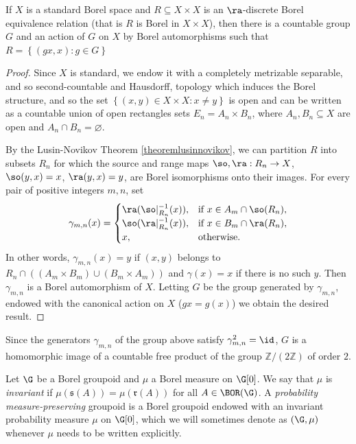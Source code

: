 \begin{corollary}\label{corollaryfeldmanmoore}
If $X$ is a standard Borel space and $R\subseteq X\times X$ is an $\ra$-discrete Borel equivalence relation (that is $R$ is Borel in $X\times X$), then there is a countable group $G$ and an action of $G$ on $X$ by Borel automorphisms such that $R=\left\{(gx,x):g\in G\right\}$
\end{corollary}
\begin{proof}
Since $X$ is standard, we endow it with a completely metrizable separable, and so second-countable and Hausdorff, topology which induces the Borel structure, and so the set $\left\{(x,y)\in X\times X:x\neq y\right\}$ is open and can be written as a countable union of open rectangles sets $E_n=A_n\times B_n$, where $A_n,B_n\subseteq X$ are open and $A_n\cap B_n=\varnothing$.

By the Lusin-Novikov Theorem \ref{theoremlusinnovikov}, we can partition $R$ into subsets $R_n$ for which the source and range maps $\so,\ra:R_n\to X$, $\so(y,x)=x$, $\ra(y,x)=y$, are Borel isomorphisms onto their images. For every pair of positive integers $m,n$, set
\[\gamma_{m,n}(x)=\begin{cases}
\ra(\so|_{R_n}^{-1}(x)),&\text{if }x\in A_m\cap\so(R_n),\\
\so(\ra|_{R_n}^{-1}(x)),&\text{if }x\in B_m\cap\ra(R_n),\\
x,&\text{otherwise.}
\end{cases}\]
In other words, $\gamma_{m,n}(x)=y$ if $(x,y)$ belongs to $R_n\cap((A_m\times B_m)\cup (B_m\times A_m))$ and $\gamma(x)=x$ if there is no such $y$. Then $\gamma_{m,n}$ is a Borel automorphism of $X$. Letting $G$ be the group generated by $\gamma_{m,n}$, endowed with the canonical action on $X$ ($gx=g(x)$) we obtain the desired result.\qedhere
\end{proof}

\begin{remark}
Since the generators $\gamma_{m,n}$ of the group above satisfy $\gamma_{m,n}^2=\id$, $G$ is a homomorphic image of a countable free product of the group $\mathbb{Z}/(2\mathbb{Z})$ of order $2$.
\end{remark}

\begin{definition}\label{definitionpmpgroupoid}
Let $\G$ be a Borel groupoid and $\mu$ a Borel measure on $\G[0]$. We say that $\mu$ is \emph{invariant} if $\mu(\mathfrak{s}(A))=\mu(\mathfrak{r}(A))$ for all $A\in\BOR(\G)$. A \emph{probability measure-preserving} groupoid is a Borel groupoid endowed with an invariant probability measure $\mu$ on $\G[0]$, which we will sometimes denote as $(\G,\mu)$ whenever $\mu$ needs to be written explicitly.
\end{definition}


